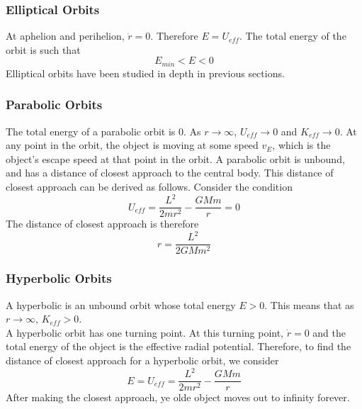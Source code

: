 \documentclass{article}
\begin{document}
\subsubsection{Elliptical Orbits}
At aphelion and perihelion, $\dot r=0$.  Therefore $E=U_{eff}$. The total energy of the orbit is such that
$$E_{min}<E<0$$
Elliptical orbits have been studied in depth in previous sections.
\subsubsection{Parabolic Orbits}
The total energy of a parabolic orbit is 0. As $r\rightarrow \infty$, $U_{eff}\rightarrow0$ and $K_{eff}\rightarrow0$. At any point in the orbit, the object is moving at some speed $v_E$, which is the object's escape speed at that point in the orbit. A parabolic orbit is unbound, and has a distance of closest approach to the central body. This distance of closest approach can be derived as follows. Consider the condition
$$U_{eff}=\frac{L^2}{2mr^2}-\frac{GMm}{r}=0$$
The distance of closest approach is therefore 
$$r=\frac{L^2}{2GMm^2}$$
\subsubsection{Hyperbolic Orbits}
A hyperbolic is an unbound orbit whose total energy $E>0$. This means that as $r\rightarrow \infty$, $K_{eff}>0$.
\\
A hyperbolic orbit has one turning point. At this turning point, $\dot r=0$ and the total energy of the object is the effective radial potential. Therefore, to find the distance of closest approach for a hyperbolic orbit, we consider
$$E=U_{eff}=\frac{L^2}{2mr^2}-\frac{GMm}{r}$$
After making the closest approach, ye olde object moves out to infinity forever.
\end{document}
